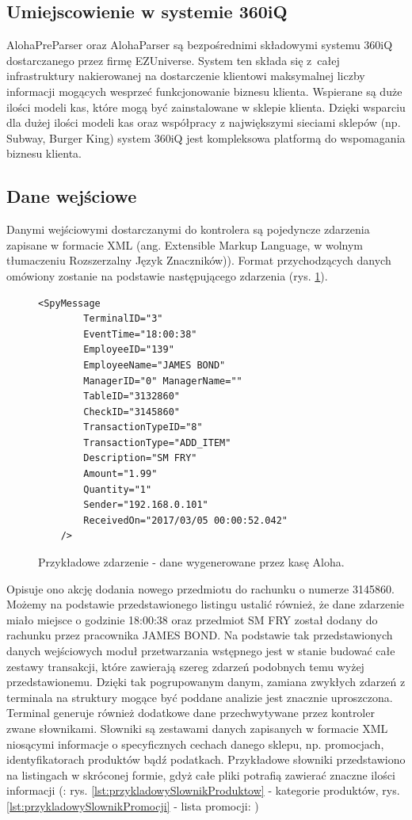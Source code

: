 \documentclass[a4paper]{book}
\begin{document}
\subsection{Umiejscowienie w systemie 360iQ}
AlohaPreParser oraz AlohaParser są bezpośrednimi składowymi systemu 360iQ dostarczanego przez firmę EZUniverse. System ten składa się z~całej infrastruktury nakierowanej na dostarczenie klientowi maksymalnej liczby informacji mogących wesprzeć funkcjonowanie biznesu klienta. Wspierane są duże ilości modeli kas, które mogą być zainstalowane w sklepie klienta. Dzięki wsparciu dla dużej ilości modeli kas oraz współpracy z największymi sieciami sklepów (np. Subway, Burger King) system 360iQ jest kompleksowa platformą do wspomagania biznesu klienta.
\subsection{Dane wejściowe}
Danymi wejściowymi dostarczanymi do kontrolera są pojedyncze zdarzenia zapisane w formacie XML (ang. Extensible Markup Language, w wolnym tłumaczeniu Rozszerzalny Język Znaczników)).
Format przychodzących danych omówiony zostanie na podstawie następującego zdarzenia (rys. \ref{lst:przykladoweZdarzenieAloha}).  
\begin{figure}[t]
	\begin{lstlisting}[frame=single, breaklines=true, numbers=none]
	<SpyMessage 
		TerminalID="3"
		EventTime="18:00:38" 
		EmployeeID="139" 
		EmployeeName="JAMES BOND" 
		ManagerID="0" ManagerName="" 
		TableID="3132860" 
		CheckID="3145860" 
		TransactionTypeID="8" 
		TransactionType="ADD_ITEM" 
		Description="SM FRY" 
		Amount="1.99" 
		Quantity="1" 
		Sender="192.168.0.101" 
		ReceivedOn="2017/03/05 00:00:52.042" 
	/>
	\end{lstlisting}
	\caption{Przykładowe zdarzenie - dane wygenerowane przez kasę Aloha.}
	\label{lst:przykladoweZdarzenieAloha}
\end{figure}
Opisuje ono akcję dodania nowego przedmiotu do rachunku o numerze 3145860. Możemy na podstawie przedstawionego listingu ustalić również, że dane zdarzenie miało miejsce o godzinie 18:00:38 oraz przedmiot SM FRY został dodany do rachunku przez pracownika JAMES BOND. Na podstawie tak przedstawionych danych wejściowych moduł przetwarzania wstępnego jest w stanie budować całe zestawy transakcji, które zawierają szereg zdarzeń podobnych temu wyżej przedstawionemu. Dzięki tak pogrupowanym danym, zamiana zwykłych zdarzeń z terminala na struktury mogące być poddane analizie jest znacznie uproszczona. Terminal generuje również dodatkowe dane przechwytywane przez kontroler zwane słownikami. Słowniki są zestawami danych zapisanych w formacie XML niosącymi informacje o specyficznych cechach danego sklepu, np. promocjach, identyfikatorach produktów bądź podatkach. Przykładowe słowniki przedstawiono na listingach w skróconej formie, gdyż całe pliki potrafią zawierać znaczne ilości informacji (: rys. \ref{lst:przykladowySlownikProduktow} - kategorie produktów, rys. \ref{lst:przykladowySlownikPromocji} - lista promocji: )
\end{document}
